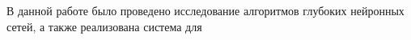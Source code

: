 В данной работе было проведено исследование алгоритмов глубоких нейронных сетей, а также реализована система для 

\clearpage